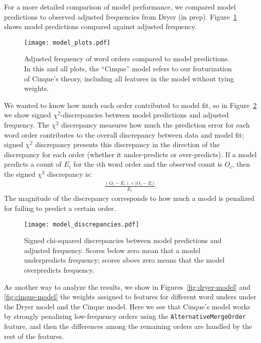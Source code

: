 \documentclass[11pt]{article}
\newcommand{\alternativeMergeOrder}{\texttt{AlternativeMergeOrder}\xspace}
\begin{document}
For a more detailed comparison of model performance, we compared model predictions to observed adjusted frequencies from Dryer (in prep). Figure~\ref{fig:af-predictions} shows model predictions compared against adjusted frequency.

\begin{figure}[ht!]
  \centering
  \texttt{[image: model\_plots.pdf]}
  \caption{Adjusted frequency of word orders compared to model predictions. In this and all plots, the ``Cinque'' model refers to our featurization of Cinque's theory, including all features in the model without tying weights.}
  \label{fig:af-predictions}
\end{figure}


We wanted to know how much each order contributed to model fit, so in Figure~\ref{fig:af-discrepancies} we show signed $\chi^2$-discrepancies between model predictions and adjusted frequency. The $\chi^2$ discrepancy measures how much the prediction error for each word order contributes to the overall discrepancy between data and model fit; signed $\chi^2$ discrepancy presents this discrepancy in the direction of the discrepancy for each order (whether it under-predicts or over-predicts).
If a model predicts a count of $E_i$ for the $i$th word order and the observed count is $O_i$, then the signed $\chi^2$ discrepancy is:
\begin{align}
  \nonumber
  \frac{(O_i - E_i) \times |O_i - E_i|}
       {E_i}.
\end{align}
The magnitude of the discrepancy corresponds to how much a model is penalized for failing to predict a certain order.

\begin{figure}[ht!]
  \centering
  \texttt{[image: model\_discrepancies.pdf]}
  \caption{Signed chi-squared discrepancies between model predictions and adjusted frequency. Scores below zero mean that a model underpredicts frequency; scores above zero means that the model overpredicts frequency.}
  \label{fig:af-discrepancies}
\end{figure}

As another way to analyze the results, we show in Figures~\ref{fig:dryer-model} and \ref{fig:cinque-model} the weights assigned to features for different word unders under the Dryer model and the Cinque model.
Here we see that Cinque's model works by strongly penalizing low-frequency orders using the \alternativeMergeOrder feature, and then the differences among the remaining orders are handled by the rest of the features.
\end{document}
